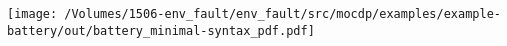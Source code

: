 
    \texttt{[image: /Volumes/1506-env\_fault/env\_fault/src/mocdp/examples/example-battery/out/battery\_minimal-syntax\_pdf.pdf]}
    